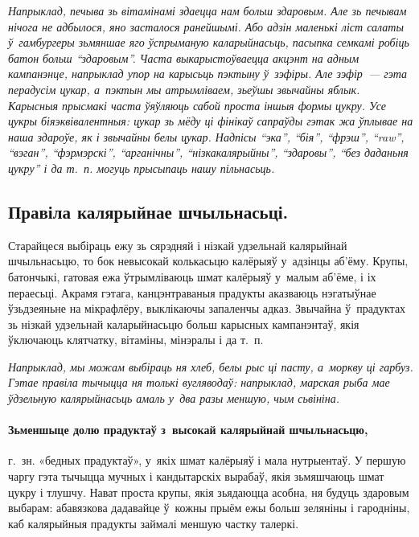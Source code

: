 \emph{Напрыклад, печыва зь вітамінамі здаецца нам больш здаровым. Але зь печывам нічога не адбылося, яно засталося ранейшымі. Або адзін маленькі ліст салаты ў~гамбургеры зьмяншае яго ўспрыманую каларыйнасьць, пасыпка семкамі робіць батон больш ``здаровым''. Часта выкарыстоўваецца акцэнт на адным кампанэнце, напрыклад упор на карысьць пэктыну ў~зэфіры. Але зэфір~--- гэта перадусім цукар, а~пэктын мы атрымліваем, зьеўшы звычайны яблык. Карысныя прысмакі часта ўяўляюць сабой проста іншыя формы цукру. Усе цукры біяэквівалентныя: цукар зь мёду ці фінікаў сапраўды гэтак жа ўплывае на наша здароўе, як і звычайны белы цукар. Надпісы ``эка'', ``бія'', ``фрэш'', ``raw'', ``вэган'', ``фэрмэрскі'', ``арганічны'', ``нізкакалярыйны'', ``здаровы'', ``без даданьня цукру'' і да т.~п. могуць прысыпаць нашу пільнасьць.}

\subsection*{Правіла калярыйнае шчыльнасьці.}
Старайцеся выбіраць ежу зь сярэдняй і нізкай удзельнай калярыйнай шчыльнасьцю, то бок невысокай колькасьцю калёрыяў у~адзінцы аб'ёму. Крупы, батончыкі, гатовая ежа ўтрымліваюць шмат калёрыяў у~малым аб'ёме, і іх пераесьці. Акрамя гэтага, канцэнтраваныя прадукты аказваюць нэгатыўнае ўзьдзеяньне на мікрафлёру, выклікаючы запаленчы адказ. Звычайна ў~прадуктах зь нізкай удзельнай каларыйнасьцю больш карысных кампанэнтаў, якія ўключаюць клятчатку, вітаміны, мінэралы і да т.~п.

\emph{Напрыклад, мы можам выбіраць ня хлеб, белы рыс ці пасту, а~моркву ці гарбуз. Гэтае правіла тычыцца ня толькі вугляводаў: напрыклад, марская рыба мае ўдзельную калярыйнасьць амаль у~два разы меншую, чым сьвініна.}

\paragraph{Зьменшыце долю прадуктаў з~высокай калярыйнай шчыльнасьцю,} г.~зн. «бедных прадуктаў», у~якіх шмат калёрыяў і мала нутрыентаў. У першую чаргу гэта тычыцца мучных і кандытарскіх вырабаў, якія зьмяшчаюць шмат цукру і тлушчу. Нават проста крупы, якія зьядаюцца асобна, ня будуць здаровым выбарам: абавязкова дадавайце ў~кожны прыём ежы больш зеляніны і гародніны, каб калярыйныя прадукты займалі меншую частку талеркі.

